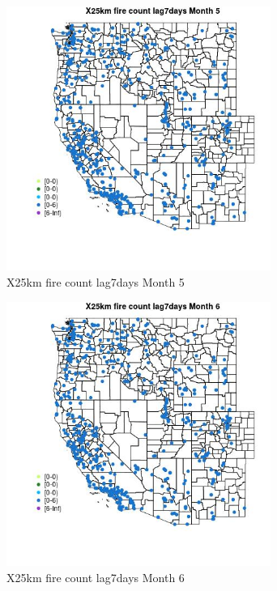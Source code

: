 \begin{figure} 
\centering  
\includegraphics[width=0.77\textwidth]{Code_Outputs/Report_ML_input_PM25_Step4_part_e_de_duplicated_aves_compiled_2019-05-14wNAs_MapObsMo5X25km_fire_count_lag7days.jpg} 
\caption{\label{fig:Report_ML_input_PM25_Step4_part_e_de_duplicated_aves_compiled_2019-05-14wNAsMapObsMo5X25km_fire_count_lag7days}X25km fire count lag7days Month 5} 
\end{figure} 
 

\begin{figure} 
\centering  
\includegraphics[width=0.77\textwidth]{Code_Outputs/Report_ML_input_PM25_Step4_part_e_de_duplicated_aves_compiled_2019-05-14wNAs_MapObsMo6X25km_fire_count_lag7days.jpg} 
\caption{\label{fig:Report_ML_input_PM25_Step4_part_e_de_duplicated_aves_compiled_2019-05-14wNAsMapObsMo6X25km_fire_count_lag7days}X25km fire count lag7days Month 6} 
\end{figure} 
 

